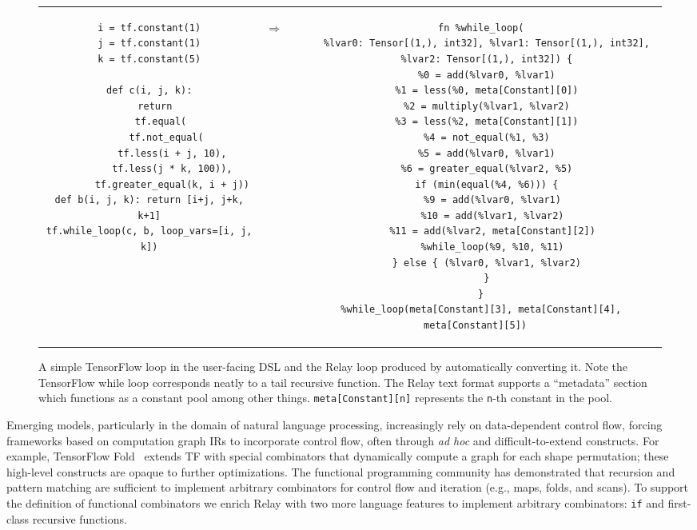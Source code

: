 \begin{figure*}[htb!]
  \begin{tabular}{ccc}
  \begin{minipage}{0.4\textwidth}
  \begin{verbatim}
i = tf.constant(1)
j = tf.constant(1)
k = tf.constant(5)

def c(i, j, k):
  return
    tf.equal(
      tf.not_equal(
        tf.less(i + j, 10),
        tf.less(j * k, 100)),
        tf.greater_equal(k, i + j))
def b(i, j, k): return [i+j, j+k, k+1]
tf.while_loop(c, b, loop_vars=[i, j, k])
  \end{verbatim}
  \end{minipage}
& \hspace{-2.0em}
\begin{Huge}
  $\Rightarrow$
\end{Huge}
&
  \begin{minipage}{0.5\textwidth}
  \begin{verbatim}
  fn %while_loop(
    %lvar0: Tensor[(1,), int32], %lvar1: Tensor[(1,), int32],
    %lvar2: Tensor[(1,), int32]) {
    %0 = add(%lvar0, %lvar1)
    %1 = less(%0, meta[Constant][0])
    %2 = multiply(%lvar1, %lvar2)
    %3 = less(%2, meta[Constant][1])
    %4 = not_equal(%1, %3)
    %5 = add(%lvar0, %lvar1)
    %6 = greater_equal(%lvar2, %5)
    if (min(equal(%4, %6))) {
      %9 = add(%lvar0, %lvar1)
      %10 = add(%lvar1, %lvar2)
      %11 = add(%lvar2, meta[Constant][2])
      %while_loop(%9, %10, %11)
    } else { (%lvar0, %lvar1, %lvar2)
    }
  }
  %while_loop(meta[Constant][3], meta[Constant][4], meta[Constant][5])
  \end{verbatim}
  \end{minipage}
  \end{tabular}
  \caption{\textmd{
    A simple TensorFlow loop in the user-facing DSL and the Relay
      loop produced by automatically converting it.
    Note the TensorFlow while loop corresponds neatly to a tail recursive
      function.
    The Relay text format supports a ``metadata'' section which functions
      as a constant pool among other things.
    \texttt{meta[Constant][n]} represents the \texttt{n}-th constant in the
      pool.
  }}
  \label{fig:tf_to_relay_loop}
  \end{figure*}

Emerging models, particularly in the domain of natural language processing, increasingly
  rely on data-dependent control flow, forcing frameworks based on computation graph IRs
  to incorporate control flow, often through \textit{ad hoc} and difficult-to-extend constructs.
For example, TensorFlow Fold~\citep{tf_fold} extends TF with special combinators that
  dynamically compute a graph for each shape permutation;
  these high-level constructs are opaque to further optimizations.
The functional programming community has demonstrated that recursion and pattern matching are sufficient
  to implement arbitrary combinators for control flow and iteration (e.g., maps, folds, and scans).
To support the definition of functional combinators
  we enrich Relay with two more language
  features to implement arbitrary combinators: \verb|if| and first-class recursive functions.

